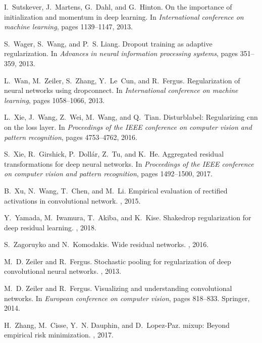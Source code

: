 \documentclass[11pt]{article}
\begin{document}
\begin{thebibliography}{10}
I.~Sutskever, J.~Martens, G.~Dahl, and G.~Hinton.
\newblock On the importance of initialization and momentum in deep learning.
\newblock In {\em International conference on machine learning}, pages
  1139--1147, 2013.

S.~Wager, S.~Wang, and P.~S. Liang.
\newblock Dropout training as adaptive regularization.
\newblock In {\em Advances in neural information processing systems}, pages
  351--359, 2013.

L.~Wan, M.~Zeiler, S.~Zhang, Y.~Le~Cun, and R.~Fergus.
\newblock Regularization of neural networks using dropconnect.
\newblock In {\em International conference on machine learning}, pages
  1058--1066, 2013.

L.~Xie, J.~Wang, Z.~Wei, M.~Wang, and Q.~Tian.
\newblock Disturblabel: Regularizing cnn on the loss layer.
\newblock In {\em Proceedings of the IEEE conference on computer vision and
  pattern recognition}, pages 4753--4762, 2016.

S.~Xie, R.~Girshick, P.~Doll{\'a}r, Z.~Tu, and K.~He.
\newblock Aggregated residual transformations for deep neural networks.
\newblock In {\em Proceedings of the IEEE conference on computer vision and
  pattern recognition}, pages 1492--1500, 2017.

B.~Xu, N.~Wang, T.~Chen, and M.~Li.
\newblock Empirical evaluation of rectified activations in convolutional
  network.
, 2015.

Y.~Yamada, M.~Iwamura, T.~Akiba, and K.~Kise.
\newblock Shakedrop regularization for deep residual learning.
, 2018.

S.~Zagoruyko and N.~Komodakis.
\newblock Wide residual networks.
, 2016.

M.~D. Zeiler and R.~Fergus.
\newblock Stochastic pooling for regularization of deep convolutional neural
  networks.
, 2013.

M.~D. Zeiler and R.~Fergus.
\newblock Visualizing and understanding convolutional networks.
\newblock In {\em European conference on computer vision}, pages 818--833.
  Springer, 2014.

H.~Zhang, M.~Cisse, Y.~N. Dauphin, and D.~Lopez-Paz.
\newblock mixup: Beyond empirical risk minimization.
, 2017.

\end{thebibliography}
\end{document}
